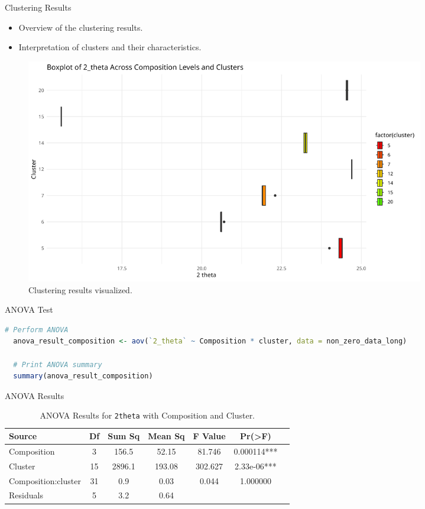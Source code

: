 \documentclass[aspectratio=169]{beamer}
\begin{document}
\begin{frame}{Clustering Results}
    \begin{itemize}
        \item Overview of the clustering results.
        \item Interpretation of clusters and their characteristics.
    \end{itemize}

    \begin{figure}
        \includegraphics[width=0.85\textwidth]{../plot/theta_zoom.png}
        \caption{Clustering results visualized.}
    \end{figure}
\end{frame}

\begin{frame}[fragile]{ANOVA Test}
  \begin{lstlisting}[language=R, basicstyle=\small\ttfamily]
  # Perform ANOVA
  anova_result_composition <- aov(`2_theta` ~ Composition * cluster, data = non_zero_data_long)
  
  # Print ANOVA summary
  summary(anova_result_composition)
  \end{lstlisting}
\end{frame}


\begin{frame}{ANOVA Results}
  
\begin{table}[ht]
\centering
\begin{tabular}{lcccccc}
\toprule
\textbf{Source} & \textbf{Df} & \textbf{Sum Sq} & \textbf{Mean Sq} & \textbf{F Value} & \textbf{Pr(>F)} \\
\midrule
Composition & 3 & 156.5 & 52.15 & 81.746 & 0.000114*** \\
Cluster & 15 & 2896.1 & 193.08 & 302.627 & 2.33e-06*** \\
Composition:cluster & 31 & 0.9 & 0.03 & 0.044 & 1.000000 \\
Residuals & 5 & 3.2 & 0.64 & & \\
\bottomrule
\end{tabular}
\caption{ANOVA Results for \texttt{2theta} with Composition and Cluster.}
\label{tab:anova_results}
\end{table}

\end{frame}
\end{document}
